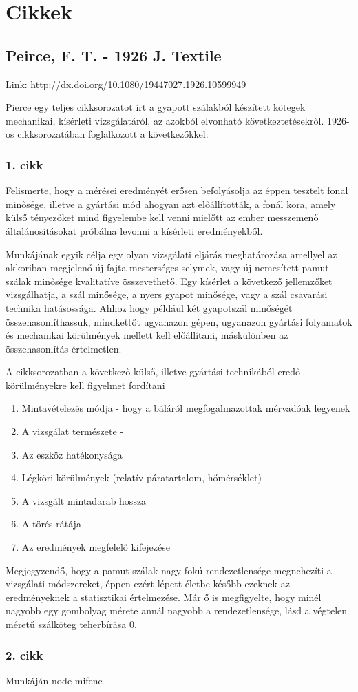 \chapter{Cikkek}
\section{Peirce, F. T. - 1926 J. Textile}
Link: 	http://dx.doi.org/10.1080/19447027.1926.10599949

Pierce egy teljes cikksorozatot írt a gyapott szálakból készített kötegek mechanikai, kísérleti vizsgálatáról, az azokból elvonható következtetésekről.
1926-os cikksorozatában foglalkozott a következőkkel:

\subsection{1. cikk}
Felismerte, hogy a mérései eredményét erősen befolyásolja az éppen tesztelt fonal minősége, illetve a gyártási mód ahogyan azt előállították, a fonál kora, amely külső tényezőket mind figyelembe kell venni mielőtt az ember messzemenő általánosításokat próbálna levonni a kísérleti eredményekből.

Munkájának egyik célja egy olyan vizsgálati eljárás meghatározása amellyel az akkoriban megjelenő új fajta mesterséges selymek, vagy új nemesített pamut szálak minősége kvalitatíve összevethető. 
Egy kísérlet a következő jellemzőket vizsgálhatja, a szál minősége, a nyers gyapot minősége, vagy a szál csavarási technika hatásossága.
Ahhoz hogy például két gyapotszál minőségét összehasonlíthassuk, mindkettőt ugyanazon gépen, ugyanazon gyártási folyamatok és mechanikai körülmények mellett kell előállítani, máskülönben az összehasonlítás értelmetlen.

A cikksorozatban a következő külső, illetve gyártási technikából eredő körülményekre kell figyelmet fordítani
\begin{enumerate}
\item Mintavételezés módja - hogy a báláról megfogalmazottak mérvadóak legyenek
\item A vizsgálat természete - 
\item Az eszköz hatékonysága
\item Légköri körülmények (relatív páratartalom, hőmérséklet)
\item A vizsgált mintadarab hossza
\item A törés rátája
\item Az eredmények megfelelő kifejezése
\end{enumerate}

Megjegyzendő, hogy a pamut szálak nagy fokú rendezetlensége megnehezíti a vizsgálati módszereket, éppen ezért lépett életbe később ezeknek az eredményeknek a statisztikai értelmezése. Már ő is megfigyelte, hogy minél nagyobb egy gombolyag mérete annál nagyobb a rendezetlensége, lásd a végtelen méretű szálköteg teherbírása 0.




\subsection{2. cikk}
Munkáján node mifene
